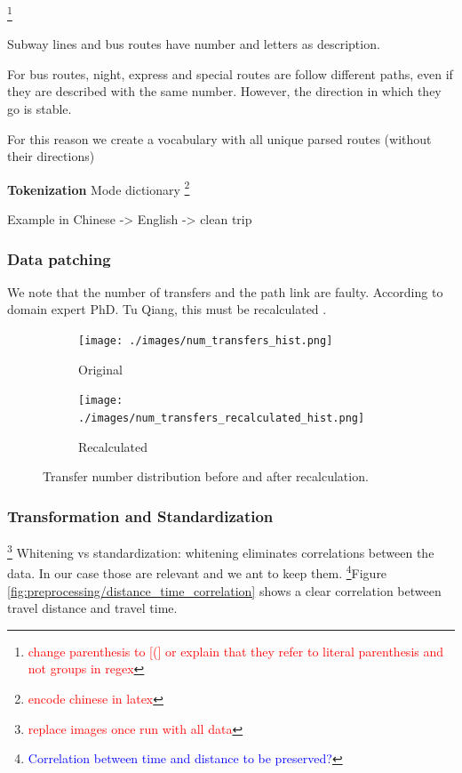 \documentclass{article}
\newcommand{\selfnote}[1]{\footnote{\textcolor{red}{#1}}}
\newcommand{\technicalDoubt}[1]{\footnote{\textcolor{blue}{#1}}}
\begin{document}
\selfnote{change parenthesis to [(] or explain that they refer to literal parenthesis and not groups in regex}	
	
Subway lines and bus routes have number and letters as description. 

For bus routes, night, express and special routes are follow different paths, even if they are described with the same number. However, the direction in which they go is stable. 

For this reason we create a vocabulary with all unique parsed routes (without their directions)

\textbf{Tokenization}
Mode dictionary \selfnote{encode chinese in latex}



Example in Chinese -> English -> clean trip



\subsubsection{Data patching}
We note that the number of transfers and the path link are faulty. According to domain expert PhD. Tu Qiang, this must be recalculated \cite{tommy}.

\begin{figure}[H]
  \centering
  \begin{subfigure}[b]{.45\textwidth}
  	\centering
  	\texttt{[image: ./images/num\_transfers\_hist.png]}
  	\caption{Original}
  \end{subfigure}
  \begin{subfigure}[b]{.45\textwidth}
  	\centering
  	\texttt{[image: ./images/num\_transfers\_recalculated\_hist.png]}
  	\caption{Recalculated}
  \end{subfigure}
  \caption{Transfer number distribution before and after recalculation.}
  	\label{fig:preprocessing/num_transfers}
\end{figure}

\subsubsection{Transformation and Standardization} \selfnote{replace images once run with all data}
Whitening vs standardization: whitening eliminates correlations between the data. In our case those are relevant and we ant to keep them. \technicalDoubt{Correlation between time and distance to be preserved?}Figure \ref{fig:preprocessing/distance_time_correlation} shows a clear correlation between travel distance and travel time. 
\end{document}
